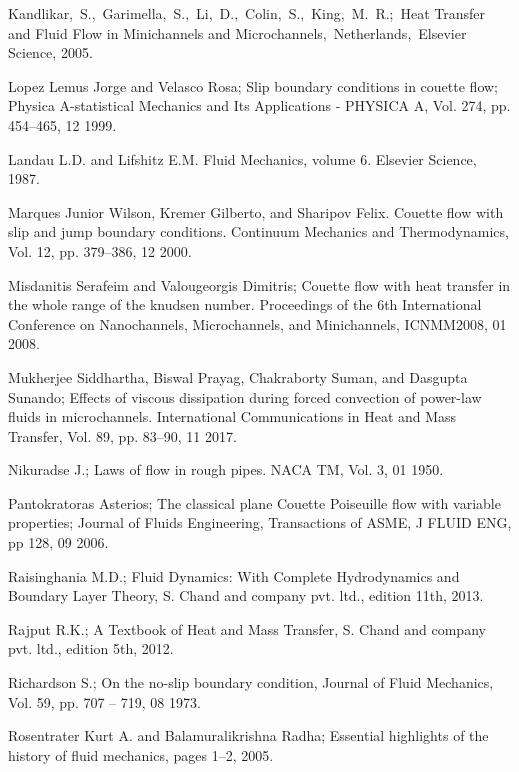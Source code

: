 \documentclass[14pt,one side, a4paper]{extbook}
\begin{document}
\begin{thebibliography}{29}
	 		 Kandlikar, S., Garimella, S., Li, D., Colin, S., King, M. R.; Heat Transfer and Fluid Flow in Minichannels and Microchannels, Netherlands, Elsevier Science, 2005.
	 		
	 		 Lopez Lemus Jorge and Velasco Rosa; Slip boundary conditions in
	 		couette flow; Physica A-statistical Mechanics and Its Applications
	 		- PHYSICA A, Vol. 274, pp. 454–465, 12 1999.
	 		
	 		 Landau L.D. and Lifshitz E.M. Fluid Mechanics, volume 6. Elsevier Science, 1987.
	 		
	 		  Marques Junior Wilson, Kremer Gilberto, and Sharipov Felix.
	 		Couette flow with slip and jump boundary conditions. Continuum
	 		Mechanics and Thermodynamics, Vol. 12, pp. 379–386, 12 2000.
	 		
	 		
	 		 Misdanitis Serafeim and Valougeorgis Dimitris; Couette flow with
	 		heat transfer in the whole range of the knudsen number. Proceedings of the 6th International Conference on Nanochannels, Microchannels, and Minichannels, ICNMM2008, 01 2008.
	 		
	 		 Mukherjee Siddhartha, Biswal Prayag, Chakraborty Suman, and
	 		Dasgupta Sunando; Effects of viscous dissipation during forced
	 		convection of power-law fluids in microchannels. International
	 		Communications in Heat and Mass Transfer, Vol. 89, pp. 83–90, 11 2017.
	 		
	 		  Nikuradse J.; Laws of flow in rough pipes. NACA TM, Vol. 3, 01 1950.
	 	
	 					
	 		 Pantokratoras Asterios; The classical plane Couette Poiseuille flow with variable properties; Journal of Fluids Engineering, Transactions of ASME, J FLUID ENG, pp 128, 09 2006. 
	 	    
	 	      Raisinghania M.D.; Fluid Dynamics: With Complete Hydrodynamics and Boundary Layer Theory, S. Chand and company pvt. ltd., edition 11th, 2013.
	 	    
	 	      Rajput R.K.; A Textbook of Heat and Mass Transfer, S. Chand and company pvt. ltd., edition 5th,
	 	    2012.
	 	    
	 	     Richardson S.; On the no-slip boundary condition, Journal of
	 	    Fluid Mechanics, Vol. 59, pp. 707 – 719, 08 1973.
	 	    
	 	      Rosentrater Kurt A. and Balamuralikrishna Radha; Essential
	 		highlights of the history of fluid mechanics, pages 1–2, 2005.
	 	

\end{thebibliography}
\end{document}
